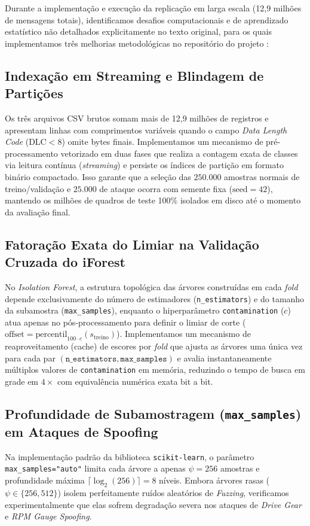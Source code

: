 \documentclass[conference]{IEEEtran}
\begin{document}
Durante a implementação e execução da replicação em larga escala (12,9 milhões de mensagens totais), identificamos desafios computacionais e de aprendizado estatístico não detalhados explicitamente no texto original, para os quais implementamos três melhorias metodológicas no repositório do projeto \cite{repo_replication}:

\subsection{Indexação em Streaming e Blindagem de Partições}
Os três arquivos CSV brutos somam mais de 12,9 milhões de registros e apresentam linhas com comprimentos variáveis quando o campo \textit{Data Length Code} ($\text{DLC} < 8$) omite bytes finais. Implementamos um mecanismo de pré-processamento vetorizado em duas fases que realiza a contagem exata de classes via leitura contínua (\textit{streaming}) e persiste os índices de partição em formato binário compactado. Isso garante que a seleção das $250.000$ amostras normais de treino/validação e $25.000$ de ataque ocorra com semente fixa ($\text{seed}=42$), mantendo os milhões de quadros de teste 100\% isolados em disco até o momento da avaliação final.

\subsection{Fatoração Exata do Limiar na Validação Cruzada do iForest}
No \textit{Isolation Forest}, a estrutura topológica das árvores construídas em cada \textit{fold} depende exclusivamente do número de estimadores (\texttt{n\_estimators}) e do tamanho da subamostra (\texttt{max\_samples}), enquanto o hiperparâmetro \texttt{contamination} ($c$) atua apenas no pós-processamento para definir o limiar de corte ($\text{offset} = \text{percentil}_{100 \cdot c}(s_{\text{treino}})$). Implementamos um mecanismo de reaproveitamento (cache) de escores por \textit{fold} que ajusta as árvores uma única vez para cada par $(\texttt{n\_estimators}, \texttt{max\_samples})$ e avalia instantaneamente múltiplos valores de \texttt{contamination} em memória, reduzindo o tempo de busca em grade em $4\times$ com equivalência numérica exata bit a bit.

\subsection{Profundidade de Subamostragem (\texttt{max\_samples}) em Ataques de Spoofing}
Na implementação padrão da biblioteca \texttt{scikit-learn}, o parâmetro \texttt{max\_samples="auto"} limita cada árvore a apenas $\psi = 256$ amostras e profundidade máxima $\lceil \log_2(256) \rceil = 8$ níveis. Embora árvores rasas ($\psi \in \{256, 512\}$) isolem perfeitamente ruídos aleatórios de \textit{Fuzzing}, verificamos experimentalmente que elas sofrem degradação severa nos ataques de \textit{Drive Gear} e \textit{RPM Gauge Spoofing}.
\end{document}
